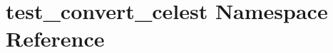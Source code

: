 \hypertarget{namespacetest__convert__celest}{\section{test\-\_\-convert\-\_\-celest Namespace Reference}
\label{namespacetest__convert__celest}
}
